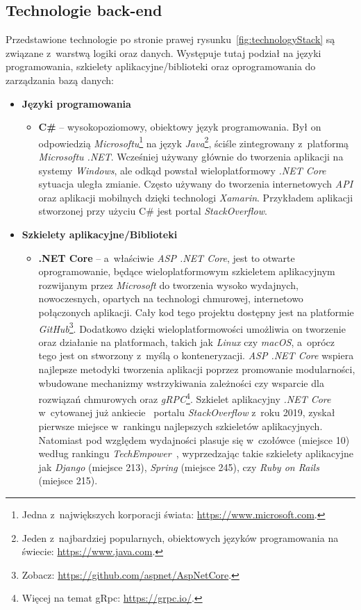 \subsection{Technologie back-end}
\label{sec:backEndTechnologie}
Przedstawione technologie po stronie prawej rysunku~\ref{fig:technologyStack} są związane z~warstwą logiki oraz danych. Występuje tutaj podział na języki programowania, szkielety aplikacyjne/biblioteki oraz oprogramowania do zarządzania bazą danych:
\newpage
\begin{itemize}
    \item \textbf{Języki programowania}
        \begin{itemize}
            \item \textbf{C\#} -- wysokopoziomowy, obiektowy język programowania. Był on odpowiedzią \emph{Microsoftu}\footnote{Jedna z~największych korporacji świata: \url{https://www.microsoft.com}.} na język \emph{Java}\footnote{Jeden z~najbardziej popularnych, obiektowych języków programowania na świecie: \url{https://www.java.com}.}, ściśle zintegrowany z~platformą \emph{Microsoftu .NET}. Wcześniej używany głównie do tworzenia aplikacji na systemy \emph{Windows}, ale odkąd powstał wieloplatformowy \emph{.NET Core} sytuacja uległa zmianie. Często używany do tworzenia internetowych \emph{API} oraz aplikacji mobilnych dzięki technologi \emph{Xamarin}. Przykładem aplikacji stworzonej przy użyciu C\# jest portal \emph{StackOverflow}.
        \end{itemize}
    \item \textbf{Szkielety aplikacyjne/Biblioteki}
    \begin{itemize}
        \item \textbf{.NET Core} -- a~właściwie \emph{ASP .NET Core}, jest to otwarte oprogramowanie, będące wieloplatformowym szkieletem aplikacyjnym rozwijanym przez \emph{Microsoft} do tworzenia wysoko wydajnych, nowoczesnych, opartych na technologi chmurowej, internetowo połączonych aplikacji. Cały kod tego projektu dostępny jest na platformie \emph{GitHub}\footnote{Zobacz: \url{https://github.com/aspnet/AspNetCore}.}. Dodatkowo dzięki wieloplatformowości umożliwia on tworzenie oraz działanie na platformach, takich jak \emph{Linux} czy \emph{macOS}, a~oprócz tego jest on stworzony z~myślą o konteneryzacji. \emph{ASP .NET Core} wspiera najlepsze metodyki tworzenia aplikacji poprzez promowanie modularności, wbudowane mechanizmy wstrzykiwania zależności czy wsparcie dla rozwiązań chmurowych oraz \emph{gRPC}\footnote{Więcej na temat gRpc: \url{https://grpc.io/}.}. Szkielet aplikacyjny \emph{.NET Core} w~cytowanej już ankiecie~\cite{StackSurvey} portalu \emph{StackOverflow} z~roku 2019, zyskał pierwsze miejsce w~rankingu najlepszych szkieletów aplikacyjnych. Natomiast pod względem wydajności plasuje się w~czołówce (miejsce 10) według rankingu \emph{TechEmpower}~\cite{WebBenchmark}, wyprzedzając takie szkielety aplikacyjne jak \emph{Django} (miejsce 213), \emph{Spring} (miejsce 245), czy \emph{Ruby on Rails} (miejsce 215).

\end{itemize}
\end{itemize}
